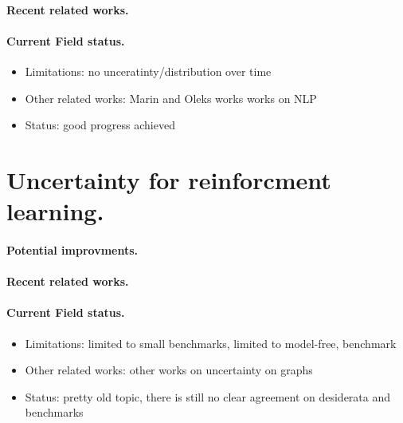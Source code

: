 \paragraph{Recent related works.}

\paragraph{Current Field status.}

\begin{itemize}
    \item Limitations: no unceratinty/distribution over time
    \item Other related works: Marin and Oleks works works on NLP
    \item Status: good progress achieved
\end{itemize}

\section{Uncertainty for reinforcment learning.}

\paragraph{Potential improvments.}

\paragraph{Recent related works.}

\paragraph{Current Field status.}

\begin{itemize}
    \item Limitations: limited to small benchmarks, limited to model-free, benchmark
    \item Other related works: other works on uncertainty on graphs
    \item Status: pretty old topic, there is still no clear agreement on desiderata and benchmarks
\end{itemize}